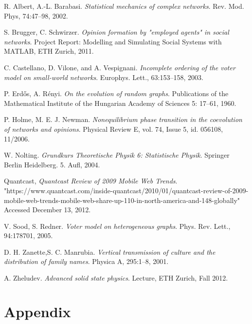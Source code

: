 \documentclass[11pt]{article}
\begin{document}
\begin{thebibliography}{9}

R. Albert, A.-L. Barabasi. \emph{Statistical mechanics of complex
networks}. Rev. Mod. Phys, 74:47–98, 2002.

S. Brugger, C. Schwirzer. \emph{Opinion formation by "employed agents"
in social networks}. Project Report: Modelling and Simulating Social Systems with MATLAB, ETH Zurich, 2011.

C. Castellano, D. Vilone, and A. Vespignani. \emph{Incomplete ordering
of the voter model on small-world networks}. Europhys.
Lett., 63:153–158, 2003.

P. Erd\H{o}s, A. R\'{e}nyi. \emph{On the evolution of random graphs}. Publications of the Mathematical Institute of the Hungarian Academy of Sciences 5: 17–61, 1960.

P. Holme, M. E. J. Newman. \emph{Nonequilibrium phase transition in the coevolution of networks and opinions}. Physical Review E, vol. 74, Issue 5, id. 056108, 11/2006.

W. Nolting. \emph{Grundkurs Theoretische Physik 6: Statistische Physik}. Springer Berlin Heidelberg. 5. Aufl, 2004.

Quantcast, \emph{Quantcast Review of 2009 Mobile Web Trends}. "https://www.quantcast.com/inside-quantcast/2010/01/quantcast-review-of-2009-mobile-web-trends-mobile-web-share-up-110-in-north-america-and-148-globally" Accessed December 13, 2012.

V. Sood, S. Redner. \emph{Voter model on heterogeneous graphs}. Phys. Rev. Lett., 94:178701, 2005.

D. H. Zanette,S. C. Manrubia. \emph{Vertical transmission of culture and the distribution of family names}. Physica A, 295:1–8, 2001.

A. Zheludev. \emph{Advanced solid state physics}. Lecture, ETH Zurich, Fall 2012.

\end{thebibliography}

\listoffigures

\newpage

\section{Appendix}
\end{document}
